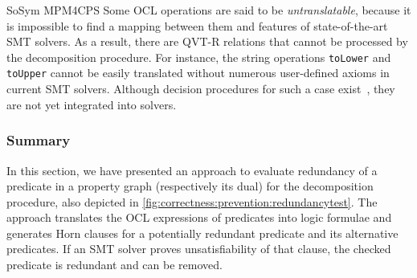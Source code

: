 \begin{copiedFrom}{SoSym MPM4CPS}
Some OCL operations are said to be \textit{untranslatable}, because it is impossible to find a mapping between them and features of state-of-the-art SMT solvers. As a result, there are QVT-R relations that cannot be processed by the decomposition procedure. For instance, the string operations \lstinline{toLower} and \lstinline{toUpper} cannot be easily translated without numerous user-defined axioms in current SMT solvers. Although decision procedures for such a case exist~\cite{veanes2012transducers}, they are not yet integrated into solvers.


\subsubsection{Summary}
In this section, we have presented an approach to evaluate redundancy of a predicate in a property graph (respectively its dual) for the decomposition procedure, also depicted in \autoref{fig:correctness:prevention:redundancytest}.
The approach translates the OCL expressions of predicates into logic formulae and generates Horn clauses for a potentially redundant predicate and its alternative predicates.
If an SMT solver proves unsatisfiability of that clause, the checked predicate is redundant and can be removed.

\end{copiedFrom} %
